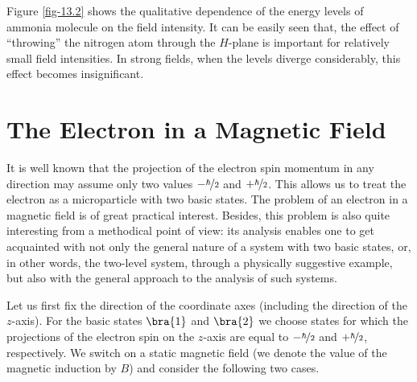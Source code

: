 \documentclass[a4paper,sfsidenotes,colorlinks=true]{tufte-book}
\numberwithin{equation}{section}
\numberwithin{figure}{section}
\begin{document}
Figure \ref{fig-13.2} shows the qualitative dependence of the energy levels of
ammonia molecule on the field intensity. It can be easily seen that,
the effect of ``throwing'' the nitrogen atom through the $H$-plane is
important for relatively small field intensities. In strong fields,
when the levels diverge considerably, this effect becomes
insignificant.


\section{The Electron in a Magnetic Field}
\label{sec-14}

It is well known that the projection of the electron spin momentum in
any direction may assume only two values $- \nicefrac{\hbar}{2}$ and
$+ \nicefrac{\hbar}{2}$. This allows us to treat the electron as a microparticle with two basic states. The problem of an electron in a magnetic field is of great practical interest. Besides, this problem is also quite interesting from a methodical point of view: its analysis enables one to get acquainted with not only the general nature of a system with two basic states, or, in other words, the two-level system, through a physically suggestive example, but also with the general approach to the analysis of such systems.

Let  us first fix the direction of the coordinate axes (including
the direction of the $z$-axis). For the basic states $\bra{1}$ and
$\bra{2}$ we choose states for which the projections of the electron
spin on the $z$-axis are equal to $- \nicefrac{\hbar}{2}$ and $+
\nicefrac{\hbar}{2}$, respectively. We switch on a static magnetic
field (we denote the value of the magnetic induction by $B$) and
consider the following two cases.
\end{document}
